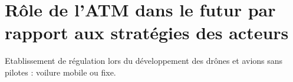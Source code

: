 
\section{Rôle de l'ATM dans le futur par rapport aux stratégies des acteurs }


Etablissement de régulation lors du développement des drônes et avions sans pilotes : voilure mobile ou fixe. 




